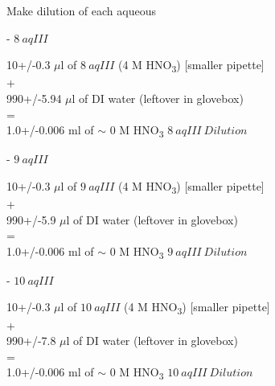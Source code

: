 \documentclass[idxtotoc,hyperref,openany,oneside]{labbook} %
\newcommand{\cmark}{\ding{51}}%
\newcommand{\done}{\rlap{$\square$}{\raisebox{2pt}{\large\hspace{1pt}\cmark}}%
  \hspace{-2.5pt}}
\newcommand{\tsbs}{\textsubscript}
\begin{document}
\begin{todolist}
\item[\done]{Make dilution of each aqueous}
  \begin{todolist}
  \item[\done]{- $\boxed{8\ aqIII}$}
  \end{todolist}
  \begin{center}
    10+/-0.3 $\mu$l of $\boxed{8\ aqIII}$
    (4 M HNO\tsbs{3}) [smaller pipette]\\
    +\\
    990+/-5.94 $\mu$l of DI water (leftover in glovebox)\\
    =\\
    1.0+/-0.006 ml of $\sim$
    0 M HNO\tsbs{3} $\boxed{8\ aqIII\ Dilution}$
  \end{center}
  \begin{todolist}
  \item[\done]{- $\boxed{9\ aqIII}$}
  \end{todolist}
  \begin{center}
    10+/-0.3 $\mu$l of $\boxed{9\ aqIII}$
    (4 M HNO\tsbs{3}) [smaller pipette]\\
    +\\
    990+/-5.9 $\mu$l of DI water (leftover in glovebox)\\
    =\\
    1.0+/-0.006 ml of $\sim$
    0 M HNO\tsbs{3} $\boxed{9\ aqIII\ Dilution}$
  \end{center}
  \begin{todolist}
  \item[\done]{- $\boxed{10\ aqIII}$}
  \end{todolist}
  \begin{center}
    10+/-0.3 $\mu$l of $\boxed{10\ aqIII}$
    (4 M HNO\tsbs{3}) [smaller pipette]\\
    +\\
    990+/-7.8 $\mu$l of DI water (leftover in glovebox)\\
    =\\
    1.0+/-0.006 ml of $\sim$
    0 M HNO\tsbs{3} $\boxed{10\ aqIII\ Dilution}$
  \end{center}


\end{todolist}
\end{document}
